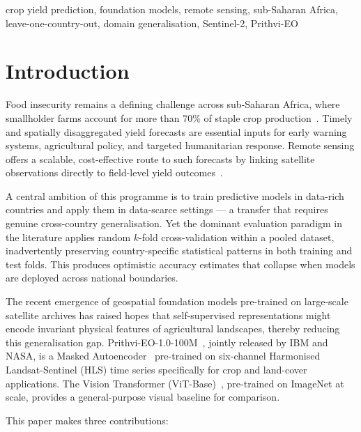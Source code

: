 \documentclass[journal]{IEEEtran}
\begin{document}
\begin{IEEEkeywords}
crop yield prediction, foundation models, remote sensing, sub-Saharan Africa,
leave-one-country-out, domain generalisation, Sentinel-2, Prithvi-EO
\end{IEEEkeywords}

\section{Introduction}
\label{sec:intro}

Food insecurity remains a defining challenge across sub-Saharan Africa,
where smallholder farms account for more than 70\% of staple crop production~\cite{burke2017sat}.
Timely and spatially disaggregated yield forecasts are essential inputs for
early warning systems, agricultural policy, and targeted humanitarian response.
Remote sensing offers a scalable, cost-effective route to such forecasts by
linking satellite observations directly to field-level yield outcomes~\cite{lobell2020eyes}.

A central ambition of this programme is to train predictive models in
data-rich countries and apply them in data-scarce settings — a transfer
that requires genuine cross-country generalisation.
Yet the dominant evaluation paradigm in the literature applies random
$k$-fold cross-validation within a pooled dataset, inadvertently preserving
country-specific statistical patterns in both training and test folds.
This produces optimistic accuracy estimates that collapse when
models are deployed across national boundaries.

The recent emergence of geospatial foundation models pre-trained on
large-scale satellite archives has raised hopes that self-supervised
representations might encode invariant physical features of agricultural
landscapes, thereby reducing this generalisation gap.
Prithvi-EO-1.0-100M~\cite{jakubik2023prithvi}, jointly released by IBM and NASA,
is a Masked Autoencoder~\cite{he2022mae} pre-trained on
six-channel Harmonised Landsat-Sentinel (HLS) time series specifically
for crop and land-cover applications.
The Vision Transformer (ViT-Base)~\cite{dosovitskiy2021vit}, pre-trained
on ImageNet at scale, provides a general-purpose visual baseline for comparison.

This paper makes three contributions:
\end{document}
